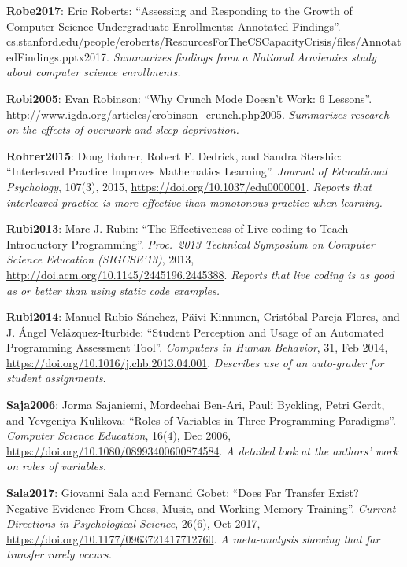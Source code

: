 \textbf{\hypertarget{b:Robe2017}{Robe2017}\label{b:Robe2017}}: Eric Roberts: ``Assessing and Responding to the Growth of Computer Science Undergraduate Enrollments: Annotated Findings''. cs.stanford.edu/people/eroberts/ResourcesForTheCSCapacityCrisis/files/AnnotatedFindings.pptx2017. \emph{Summarizes findings from a National Academies study about computer science enrollments.}

\textbf{\hypertarget{b:Robi2005}{Robi2005}\label{b:Robi2005}}: Evan Robinson: ``Why Crunch Mode Doesn't Work: 6 Lessons''. \url{http://www.igda.org/articles/erobinson_crunch.php}2005. \emph{Summarizes research on the effects of overwork and sleep deprivation.}

\textbf{\hypertarget{b:Rohrer2015}{Rohrer2015}\label{b:Rohrer2015}}: Doug Rohrer, Robert F. Dedrick, and Sandra Stershic: ``Interleaved Practice Improves Mathematics Learning''. \emph{Journal of Educational Psychology}, 107(3), 2015, \url{https://doi.org/10.1037/edu0000001}. \emph{Reports that interleaved practice is more effective than monotonous practice when learning.}

\textbf{\hypertarget{b:Rubi2013}{Rubi2013}\label{b:Rubi2013}}: Marc J. Rubin: ``The Effectiveness of Live-coding to Teach Introductory Programming''. \emph{Proc.\ 2013 Technical Symposium on Computer Science Education (SIGCSE'13)}, 2013, \url{http://doi.acm.org/10.1145/2445196.2445388}. \emph{Reports that live coding is as good as or better than using static code examples.}

\textbf{\hypertarget{b:Rubi2014}{Rubi2014}\label{b:Rubi2014}}: Manuel Rubio-Sánchez, Päivi Kinnunen, Cristóbal Pareja-Flores, and J. Ángel Velázquez-Iturbide: ``Student Perception and Usage of an Automated Programming Assessment Tool''. \emph{Computers in Human Behavior}, 31, Feb 2014, \url{https://doi.org/10.1016/j.chb.2013.04.001}. \emph{Describes use of an auto-grader for student assignments.}

\textbf{\hypertarget{b:Saja2006}{Saja2006}\label{b:Saja2006}}: Jorma Sajaniemi, Mordechai Ben-Ari, Pauli Byckling, Petri Gerdt, and Yevgeniya Kulikova: ``Roles of Variables in Three Programming Paradigms''. \emph{Computer Science Education}, 16(4), Dec 2006, \url{https://doi.org/10.1080/08993400600874584}. \emph{A detailed look at the authors' work on roles of variables.}

\textbf{\hypertarget{b:Sala2017}{Sala2017}\label{b:Sala2017}}: Giovanni Sala and Fernand Gobet: ``Does Far Transfer Exist? Negative Evidence From Chess, Music, and Working Memory Training''. \emph{Current Directions in Psychological Science}, 26(6), Oct 2017, \url{https://doi.org/10.1177/0963721417712760}. \emph{A meta-analysis showing that far transfer rarely occurs.}

